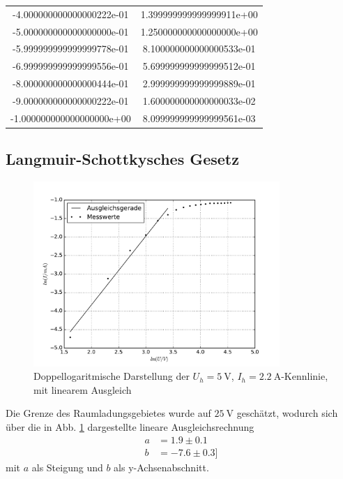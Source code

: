 \begin{table}
\begin{tabular}{|S|S|}
    -4.000000000000000222e-01 & 1.399999999999999911e+00\\
    -5.000000000000000000e-01 & 1.250000000000000000e+00\\
    -5.999999999999999778e-01 & 8.100000000000000533e-01\\
    -6.999999999999999556e-01 & 5.699999999999999512e-01\\
    -8.000000000000000444e-01 & 2.999999999999999889e-01\\
    -9.000000000000000222e-01 & 1.600000000000000033e-02\\
    -1.000000000000000000e+00 & 8.099999999999999561e-03\\
    \bottomrule
  \end{tabular}
\end{table}
\FloatBarrier

\subsection{Langmuir-Schottkysches Gesetz}

\begin{figure}
  \centering
  \includegraphics[height=7cm]{./plots/langmuir.pdf}
  \caption{Doppellogaritmische Darstellung der $U_h = \SI{5}{\volt}$, $I_h = \SI{2.2}{\ampere}$-Kennlinie, mit linearem Ausgleich}
  \label{fig:langmuir}
\end{figure}

Die Grenze des Raumladungsgebietes wurde auf $\SI{25}{\volt}$ geschätzt, wodurch sich über die in Abb. \ref{fig:langmuir} dargestellte lineare Ausgleichsrechnung
\begin{align*}
  a &= 1.9 \pm  0.1 \\
  b &= -7.6 \pm 0.3]
\end{align*}
mit $a$ als Steigung und $b$  als y-Achsenabschnitt.

